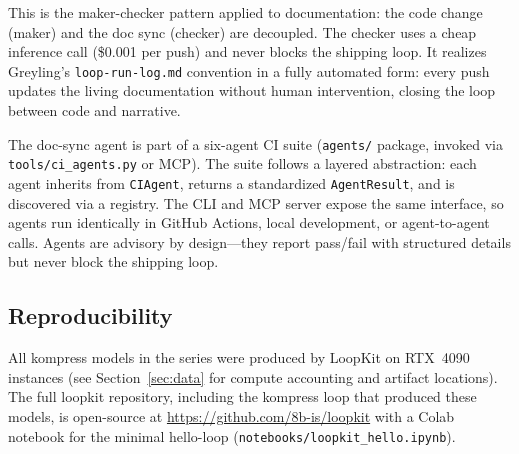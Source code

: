 This is the maker-checker pattern applied to documentation: the code change
(maker) and the doc sync (checker) are decoupled. The checker uses a cheap
inference call (\$0.001 per push) and never blocks the shipping loop. It
realizes Greyling's \texttt{loop-run-log.md} convention
\citep{greyling2026loop} in a fully automated form: every push updates the
living documentation without human intervention, closing the loop between
code and narrative.

The doc-sync agent is part of a six-agent CI suite
(\texttt{agents/} package, invoked via \texttt{tools/ci\_agents.py} or MCP).
The suite follows a layered abstraction: each agent inherits from
\texttt{CIAgent}, returns a standardized \texttt{AgentResult}, and is
discovered via a registry. The CLI and MCP server expose the same interface,
so agents run identically in GitHub Actions, local development, or agent-to-agent
calls. Agents are advisory by design---they report pass/fail with structured
details but never block the shipping loop.

\subsection{Reproducibility}
\label{sec:loopkit:repro}

All kompress models in the series were produced by LoopKit on RTX~4090
instances (see Section~\ref{sec:data} for compute accounting and artifact
locations). The
full loopkit repository, including the kompress loop that produced these
models, is open-source at \url{https://github.com/8b-is/loopkit}
with a Colab notebook for the minimal hello-loop
(\texttt{notebooks/loopkit\_hello.ipynb}).

